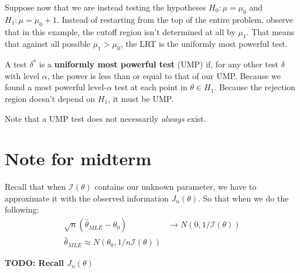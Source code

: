\documentclass[titlepage, 12pt, leqno]{article}
\begin{document}
Suppose now that we are instead testing the hypotheses $H_{0}:\mu = \mu_{0}$
and $H_{1}:\mu = \mu_{0}+1$. Instead of restarting from the top of the entire
problem, observe that in this example, the cutoff region isn't determined at all
by $\mu_{1}$. That means that against all possible $\mu_{1} > \mu_{0}$, the LRT
is the uniformly most powerful test.

\begin{definition}
    A test $\delta^{*}$ is a \textbf{uniformly most powerful test} (UMP) if, 
    for any other test $\delta$ with level $\alpha$, the power is less than or
    equal to that of our UMP. Because we found a most powerful level-$\alpha$
    test at each point in $\theta \in H_{1}$. Because the rejection region
    doesn't depend on $H_{1}$, it must be UMP.

    Note that a UMP test does not necessarily \textit{always} exist.
\end{definition}

\pagebreak
\section{Note for midterm}
Recall that when $\mathcal{I}(\theta)$ contains our unknown parameter, we have
to approximate it with the observed information $J_{n}(\theta)$. So that when
we do the following:
\begin{align*}
    \sqrt{n}(\hat \theta_{MLE} - \theta_{0}) 
    & \rightarrow N(0, 1/\mathcal{I}(\theta)) \\
    \hat \theta_{MLE} \approx N(\theta_{0}, 1/n\mathcal{I}(\theta))
\end{align*}

\textbf{TODO: Recall $J_{n}(\theta)$}
\end{document}
